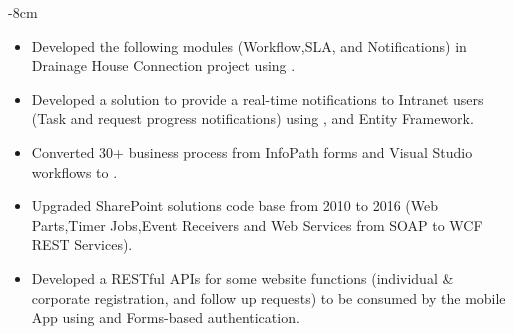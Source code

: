 \documentclass[10pt,a4paper]{altacv}
\begin{document}


\begin{adjustwidth}{}{-8cm}
\makecvheader
\end{adjustwidth}


\begin{itemize}
\item Developed the following modules (Workflow,SLA, and Notifications) in Drainage House Connection project using      . 

\item Developed a solution to provide a real-time notifications to  Intranet users (Task and request progress notifications) using ,  and Entity Framework. 

\item Converted 30+ business process from InfoPath forms and Visual Studio workflows to .
\end{itemize}

\divider

\begin{itemize}
\item Upgraded SharePoint solutions code base from 2010 to 2016 (Web Parts,Timer Jobs,Event Receivers and Web Services from SOAP to WCF REST Services).
\item Developed a RESTful APIs for some website functions (individual \& corporate registration, and follow up requests) to be consumed by the mobile App using  and Forms-based authentication. 

\end{itemize}
\end{document}
